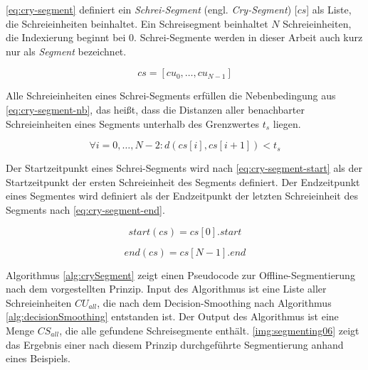 \autoref{eq:cry-segment} definiert ein \emph{Schrei-Segment} (engl. \emph{Cry-Segment}) [$cs$] als Liste, die Schreieinheiten beinhaltet. Ein Schreisegment beinhaltet $N$ Schreieinheiten, die Indexierung beginnt bei 0. Schrei-Segmente werden in dieser Arbeit auch kurz nur als \emph{Segment} bezeichnet.

\begin{equation}
cs = [cu_0 ,  \ldots,  cu_{N-1}]
\label{eq:cry-segment}
\end{equation}

Alle Schreieinheiten eines Schrei-Segments erfüllen die Nebenbedingung aus \autoref{eq:cry-segment-nb}, das heißt, dass die Distanzen aller benachbarter Schreieinheiten eines Segments unterhalb des Grenzwertes $t_{s}$ liegen.


\begin{equation}
\forall i = 0 , \ldots , N-2 : d(cs[i], cs[i+1]) < t_{s}
\label{eq:cry-segment-nb}
\end{equation}

Der Startzeitpunkt eines Schrei-Segments wird nach \autoref{eq:cry-segment-start} als der Startzeitpunkt der ersten Schreieinheit des Segments definiert. Der Endzeitpunkt eines Segmentes wird definiert als der Endzeitpunkt der letzten Schreieinheit des Segments nach \autoref{eq:cry-segment-end}.

\begin{equation}
start(cs) = cs[0].start
\label{eq:cry-segment-start}
\end{equation}

\begin{equation}
end(cs) = cs[N-1].end
\label{eq:cry-segment-end}
\end{equation}

Algorithmus \ref{alg:crySegment} zeigt einen Pseudocode zur Offline-Segmentierung nach dem vorgestellten Prinzip. Input des Algorithmus ist eine Liste aller Schreieinheiten $CU_{all}$, die nach dem Decision-Smoothing nach Algorithmus \ref{alg:decisionSmoothing} entstanden ist. Der Output des Algorithmus ist eine Menge $CS_{all}$, die alle gefundene Schreisegmente enthält. \autoref{img:segmenting06} zeigt das Ergebnis einer nach diesem Prinzip durchgeführte Segmentierung anhand eines Beispiels.

